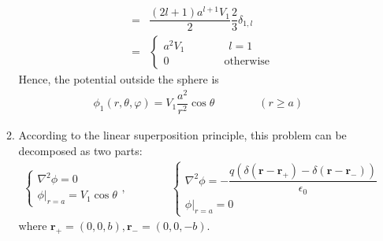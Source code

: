 \documentclass[a4paper,11pt]{article}
\begin{document}
\begin{enumerate}
\begin{enumerate}
\begin{eqnarray}
            &=&\dfrac{(2l+1)a^{l+1}V_1}{2}\dfrac{2}{3}\delta_{1,l} \nonumber \\
            &=&\begin{cases}
                a^2V_1 \quad\quad\quad\quad l=1\\
                0\quad\quad\quad\quad\quad \textrm{otherwise}
            \end{cases}
        \end{eqnarray}
        Hence, the potential outside the sphere is 
        \begin{eqnarray}
            \phi_1(r,\theta,\varphi)=V_1\dfrac{a^2}{r^2}\cos\theta\quad\quad\quad\quad (r\geqslant a)
        \end{eqnarray}
        \item According to the linear superposition principle, this problem can be decomposed as two parts:
        \begin{eqnarray}
            \begin{cases}
                \nabla^2\phi=0\\
                \left.\phi\right|_{r=a}=V_1\cos\theta
            \end{cases},
            \quad\quad\quad\quad
            \begin{cases}
                \nabla^2\phi=-\dfrac{q(\delta(\boldsymbol{r}-\boldsymbol{r}_{+})-\delta(\boldsymbol{r}-\boldsymbol{r}_{-}))}{\epsilon_0}\\
                \left.\phi\right|_{r=a}=0
            \end{cases}
        \end{eqnarray}
        where $\boldsymbol{r}_{+}=(0,0,b),\boldsymbol{r}_{-}=(0,0,-b)$.
        

\end{enumerate}
\end{enumerate}
\end{document}
